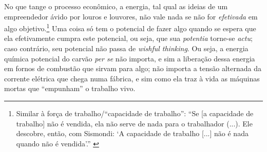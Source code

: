 \documentclass[12pt]{article}
\begin{document}
No que tange o processo econômico, a energia, tal qual as ideias de um empreendedor ávido por louros e louvores, não vale nada se não for \textit{efetivada} em algo objetivo.\footnote{Similar à força de trabalho/``capacidade de trabalho'': ``Se [a capacidade de trabalho] não é vendida, ela não serve de nada para o trabalhador (...). Ele descobre, então, com Sismondi: `A capacidade de trabalho [...] não é nada quando não é vendida'.'' \cite[p. 248]{Marx2017}} Uma coisa só tem o potencial de fazer algo quando se espera que ela efetivamente cumpra este potencial, ou seja, que sua \textit{potentia} torne-se \textit{actu}; caso contrário, seu potencial não passa de \textit{wishful thinking}. Ou seja, a energia química potencial do carvão \textit{per se} não importa, e sim a liberação dessa energia em fornos de combustão que sirvam para algo; não importa a tensão alternada da corrente elétrica que chega numa fábrica, e sim como ela traz à vida as máquinas mortas que ``empunham'' o trabalho vivo.


\printbibliography
\end{document}

